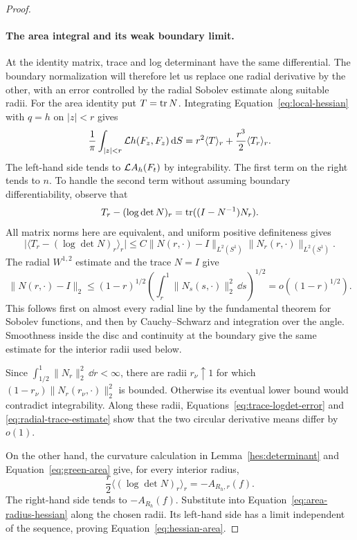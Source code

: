 \begin{proof}
\paragraph{The area integral and its weak boundary limit.}
At the identity matrix, trace and log determinant have the same
differential. The boundary normalization will therefore let us replace
one radial derivative by the other, with an error controlled by the
radial Sobolev estimate along suitable radii.
For the area identity put $T=\operatorname{tr} N$. Integrating
Equation~\eqref{eq:local-hessian} with $q=h$ on $|z|<r$ gives
\begin{equation}\label{eq:area-radius-hessian}
 \frac1\pi\int_{|z|<r}\mathcal L h(F_z,F_z)\,\mathrm d S
 =r^2\langle T\rangle_r+\frac{r^3}{2}\langle T_r\rangle_r.
\end{equation}
The left-hand side tends to $\mathcal L A_h(F_t)$ by integrability. The first
term on the right tends to $n$. To handle the second term without
assuming boundary differentiability, observe that
\begin{equation}\label{eq:trace-logdet-error}
 T_r-(\log\det N)_r=\operatorname{tr}((I-N^{-1})N_r).
\end{equation}
All matrix norms here are equivalent, and uniform positive definiteness
gives
\[
 \big|\langle T_r-(\log\det N)_r\rangle_r\big|
 \le C\|N(r,\cdot)-I\|_{L^2(S^1)}
       \|N_r(r,\cdot)\|_{L^2(S^1)}.
\]
The radial $W^{1,2}$ estimate and the trace $N=I$ give
\begin{equation}\label{eq:radial-trace-estimate}
 \|N(r,\cdot)-I\|_2
 \le(1-r)^{1/2}
       \left(\int_r^1\|N_s(s,\cdot)\|_2^2\,\dd s\right)^{1/2}
 =o((1-r)^{1/2}).
\end{equation}
This follows first on almost every radial line by the fundamental
theorem for Sobolev functions, and then by Cauchy--Schwarz and
integration over the angle. Smoothness inside the disc and continuity
at the boundary give the same estimate for the interior radii used
below.

Since $\int_{1/2}^1\|N_r\|_2^2\,\dd r<\infty$, there are radii
$r_\nu\uparrow1$ for which
$(1-r_\nu)\|N_r(r_\nu,\cdot)\|_2^2$ is bounded. Otherwise its eventual
lower bound would contradict integrability. Along these radii,
Equations~\eqref{eq:trace-logdet-error} and
\eqref{eq:radial-trace-estimate} show that the two circular derivative
means differ by $o(1)$.

On the other hand, the curvature calculation in
Lemma~\ref{hes:determinant} and Equation~\eqref{eq:green-area} give, for
every interior radius,
\[
 \frac r2\langle(\log\det N)_r\rangle_r=-A_{R_h,r}(f).
\]
The right-hand side tends to $-A_{R_h}(f)$. Substitute into
Equation~\eqref{eq:area-radius-hessian} along the chosen radii. Its
left-hand side has a limit independent of the sequence, proving
Equation~\eqref{eq:hessian-area}.
\end{proof}


